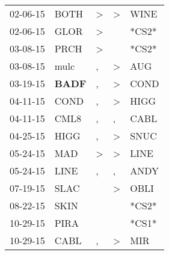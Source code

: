 \begin{supertabular}{p{0.07\textwidth}p{0.06\textwidth}p{0.02\textwidth}p{0.02\textwidth}p{0.06\textwidth}}
          02-06-15\textsuperscript{} &           BOTH\textsuperscript{} &     \textgreater &     \textgreater &           WINE\textsuperscript{} \\
          02-06-15\textsuperscript{} &           GLOR\textsuperscript{} &     \textgreater &                  &                            *CS2* \\
          03-08-15\textsuperscript{} &           PRCH\textsuperscript{} &     \textgreater &                  &                            *CS2* \\
          03-08-15\textsuperscript{} &           mulc\textsuperscript{} &                , &     \textgreater &            AUG\textsuperscript{} \\
          03-19-15\textsuperscript{} &  \textbf{BADF\textsuperscript{}} &                , &     \textgreater &           COND\textsuperscript{} \\
          04-11-15\textsuperscript{} &           COND\textsuperscript{} &                , &     \textgreater &           HIGG\textsuperscript{} \\
          04-11-15\textsuperscript{} &           CML8\textsuperscript{} &                , &                , &           CABL\textsuperscript{} \\
          04-25-15\textsuperscript{} &           HIGG\textsuperscript{} &                , &     \textgreater &           SNUC\textsuperscript{} \\
          05-24-15\textsuperscript{} &            MAD\textsuperscript{} &     \textgreater &     \textgreater &           LINE\textsuperscript{} \\
          05-24-15\textsuperscript{} &           LINE\textsuperscript{} &                , &                , &           ANDY\textsuperscript{} \\
          07-19-15\textsuperscript{} &           SLAC\textsuperscript{} &                  &     \textgreater &           OBLI\textsuperscript{} \\
          08-22-15\textsuperscript{} &           SKIN\textsuperscript{} &                  &                  &                            *CS2* \\
          10-29-15\textsuperscript{} &           PIRA\textsuperscript{} &                  &                  &                            *CS1* \\
          10-29-15\textsuperscript{} &           CABL\textsuperscript{} &                , &     \textgreater &            MIR\textsuperscript{} \\

\end{supertabular}
